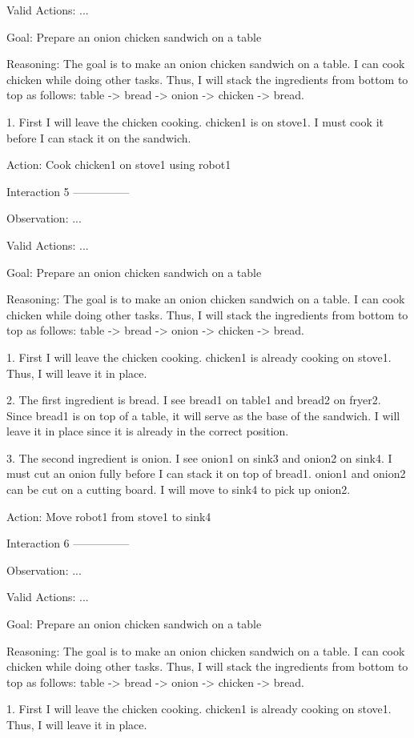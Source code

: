 Valid Actions: ...

Goal: Prepare an onion chicken sandwich on a table


Reasoning: The goal is to make an onion chicken sandwich on a table. I can cook chicken while doing other tasks. Thus, I
will stack the ingredients from bottom to top as follows: table -> bread -> onion -> chicken -> bread.

1. First I will leave the chicken cooking. chicken1 is on stove1. I must cook it before I can stack it on the sandwich.

Action: Cook chicken1 on stove1 using robot1


Interaction 5
---------------


Observation: ...

Valid Actions: ...

Goal: Prepare an onion chicken sandwich on a table


Reasoning: The goal is to make an onion chicken sandwich on a table. I can cook chicken while doing other tasks. Thus, I
will stack the ingredients from bottom to top as follows: table -> bread -> onion -> chicken -> bread.

1. First I will leave the chicken cooking. chicken1 is already cooking on stove1. Thus, I will leave it in place.

2. The first ingredient is bread. I see bread1 on table1 and bread2 on fryer2. Since bread1 is on top of a table, it will serve as the base of the sandwich. I will leave it in place since it is already in the correct position.

3. The second ingredient is onion. I see onion1 on sink3 and onion2 on sink4. I must cut an onion fully before I can stack it on top of bread1. onion1 and onion2 can be cut on a cutting board. I will move to sink4 to pick up onion2.

Action: Move robot1 from stove1 to sink4


Interaction 6
---------------


Observation: ...

Valid Actions: ...

Goal: Prepare an onion chicken sandwich on a table


Reasoning: The goal is to make an onion chicken sandwich on a table. I can cook chicken while doing other tasks. Thus, I
will stack the ingredients from bottom to top as follows: table -> bread -> onion -> chicken -> bread.

1. First I will leave the chicken cooking. chicken1 is already cooking on stove1. Thus, I will leave it in place.

